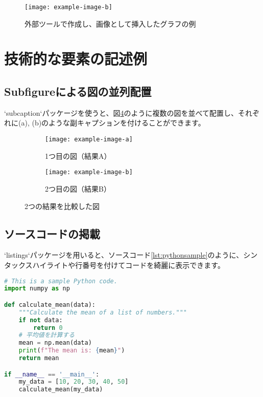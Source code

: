 \begin{figure}[htbp]
  \centering
  \texttt{[image: example-image-b]}
  \caption{外部ツールで作成し、画像として挿入したグラフの例}
  \label{fig:graph-image}
\end{figure}




\section{技術的な要素の記述例}

\subsection{Subfigureによる図の並列配置}
`subcaption`パッケージを使うと、図\ref{fig:subfigures}のように複数の図を並べて配置し、それぞれに(a), (b)のような副キャプションを付けることができます。

\begin{figure}[htbp]
  \centering
  \begin{subfigure}[b]{0.48\textwidth}
    \centering
    \texttt{[image: example-image-a]}
    \caption{1つ目の図（結果A）}
    \label{fig:sub-a}
  \end{subfigure}
  \hfill %
  \begin{subfigure}[b]{0.48\textwidth}
    \centering
    \texttt{[image: example-image-b]}
    \caption{2つ目の図（結果B）}
    \label{fig:sub-b}
  \end{subfigure}
  \caption{2つの結果を比較した図}
  \label{fig:subfigures}
\end{figure}

\subsection{ソースコードの掲載}
`listings`パッケージを用いると、ソースコード\ref{lst:pythonsample}のように、シンタックスハイライトや行番号を付けてコードを綺麗に表示できます。

\begin{lstlisting}[language=Python, caption={Pythonによる簡単なサンプルコード}, label={lst:pythonsample}]
# This is a sample Python code.
import numpy as np

def calculate_mean(data):
    """Calculate the mean of a list of numbers."""
    if not data:
        return 0
    # 平均値を計算する
    mean = np.mean(data)
    print(f"The mean is: {mean}")
    return mean

if __name__ == '__main__':
    my_data = [10, 20, 30, 40, 50]
    calculate_mean(my_data)
\end{lstlisting}

